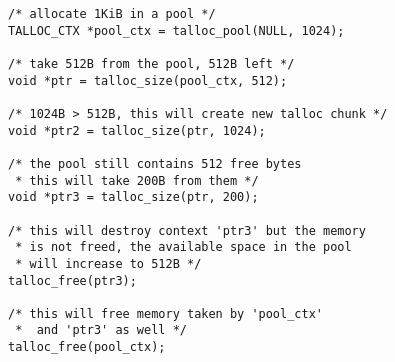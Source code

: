 \begin{lstlisting}[caption={Talloc pool},label=lst:talloc_pool]
/* allocate 1KiB in a pool */
TALLOC_CTX *pool_ctx = talloc_pool(NULL, 1024);

/* take 512B from the pool, 512B left */
void *ptr = talloc_size(pool_ctx, 512);

/* 1024B > 512B, this will create new talloc chunk */
void *ptr2 = talloc_size(ptr, 1024);

/* the pool still contains 512 free bytes
 * this will take 200B from them */
void *ptr3 = talloc_size(ptr, 200);

/* this will destroy context 'ptr3' but the memory
 * is not freed, the available space in the pool
 * will increase to 512B */
talloc_free(ptr3);

/* this will free memory taken by 'pool_ctx'
 *  and 'ptr3' as well */
talloc_free(pool_ctx);
\end{lstlisting}

